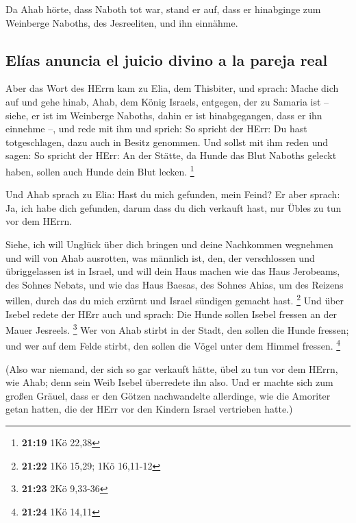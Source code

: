  Da Ahab hörte, dass Naboth tot war, stand er auf, dass
er hinabginge zum Weinberge Naboths, des Jesreeliten, und ihn einnähme.

\hypertarget{eluxedas-anuncia-el-juicio-divino-a-la-pareja-real}{%
\subsection{Elías anuncia el juicio divino a la pareja
real}\label{eluxedas-anuncia-el-juicio-divino-a-la-pareja-real}}

 Aber das Wort des HErrn kam zu Elia, dem Thisbiter, und
sprach:  Mache dich auf und gehe hinab, Ahab, dem König
Israels, entgegen, der zu Samaria ist -- siehe, er ist im Weinberge
Naboths, dahin er ist hinabgegangen, dass er ihn einnehme --,
 und rede mit ihm und sprich: So spricht der HErr: Du
hast totgeschlagen, dazu auch in Besitz genommen. Und sollst mit ihm
reden und sagen: So spricht der HErr: An der Stätte, da Hunde das Blut
Naboths geleckt haben, sollen auch Hunde dein Blut lecken. \footnote{\textbf{21:19}
  1Kö 22,38}

 Und Ahab sprach zu Elia: Hast du mich gefunden, mein
Feind? Er aber sprach: Ja, ich habe dich gefunden, darum dass du dich
verkauft hast, nur Übles zu tun vor dem HErrn.

 Siehe, ich will Unglück über dich bringen und deine
Nachkommen wegnehmen und will von Ahab ausrotten, was männlich ist, den,
der verschlossen und übriggelassen ist in Israel,  und
will dein Haus machen wie das Haus Jerobeams, des Sohnes Nebats, und wie
das Haus Baesas, des Sohnes Ahias, um des Reizens willen, durch das du
mich erzürnt und Israel sündigen gemacht hast. \footnote{\textbf{21:22}
  1Kö 15,29; 1Kö 16,11-12}  Und über Isebel redete der
HErr auch und sprach: Die Hunde sollen Isebel fressen an der Mauer
Jesreels. \footnote{\textbf{21:23} 2Kö 9,33-36}  Wer von
Ahab stirbt in der Stadt, den sollen die Hunde fressen; und wer auf dem
Felde stirbt, den sollen die Vögel unter dem Himmel fressen. \footnote{\textbf{21:24}
  1Kö 14,11}

 (Also war niemand, der sich so gar verkauft hätte, übel
zu tun vor dem HErrn, wie Ahab; denn sein Weib Isebel überredete ihn
also.  Und er machte sich zum großen Gräuel, dass er den
Götzen nachwandelte allerdinge, wie die Amoriter getan hatten, die der
HErr vor den Kindern Israel vertrieben hatte.)

